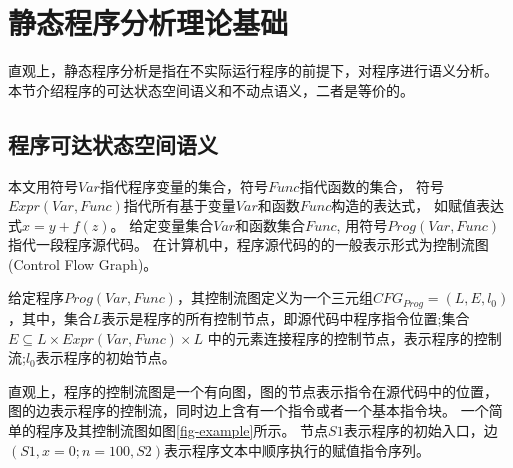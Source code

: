 \section{静态程序分析理论基础}

直观上，静态程序分析是指在不实际运行程序的前提下，对程序进行语义分析。
本节介绍程序的可达状态空间语义和不动点语义，二者是等价的。

\subsection{程序可达状态空间语义}

本文用符号$Var$指代程序变量的集合，符号$Func$指代函数的集合，
符号$Expr(Var, Func)$指代所有基于变量$Var$和函数$Func$构造的表达式，
如赋值表达式$x = y + f(z)$。
给定变量集合$Var$和函数集合$Func$, 用符号$Prog(Var, Func)$指代一段程序源代码。
在计算机中，程序源代码的的一般表示形式为控制流图(Control Flow Graph)。

\begin{definition}
给定程序$Prog(Var, Func)$，其控制流图定义为一个三元组$CFG_{Prog} = (L, E, l_0)$，其中，集合$L$表示是程序的所有控制节点，即源代码中程序指令位置;集合$E\subseteq L\times Expr(Var, Func) \times L$
	中的元素连接程序的控制节点，表示程序的控制流;$l_0$表示程序的初始节点。
\end{definition}


直观上，程序的控制流图是一个有向图，图的节点表示指令在源代码中的位置，
图的边表示程序的控制流，同时边上含有一个指令或者一个基本指令块。
一个简单的程序及其控制流图如图\ref{fig-example}所示。
节点$S1$表示程序的初始入口，边$(S1, x=0;n=100, S2)$表示程序文本中顺序执行的赋值指令序列。

